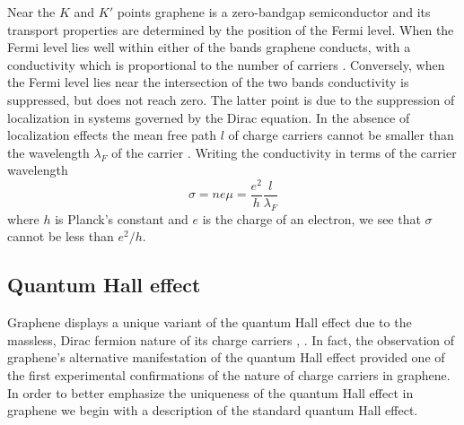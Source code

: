 \documentclass[edeposit,fullpage,draftthesis]{uiucthesis2009}
\begin{document}
        Near the $K$ and $K'$ points graphene is a zero-bandgap semiconductor and its transport properties are
        determined by the position of the Fermi level. When the Fermi level lies well within either of the bands
        graphene conducts, with a conductivity which is proportional to the number of carriers \cite{Hwang2007}.
        Conversely, when the Fermi level lies near the intersection of the two bands conductivity is suppressed,
        but does not reach zero. The latter point is due to the suppression of localization in systems governed
        by the Dirac equation. In the absence of localization effects the mean free path $l$ of charge carriers
        cannot be smaller than the wavelength $\lambda_F$ of the carrier  \cite{novoselov2005two}. Writing
        the conductivity in terms of the carrier wavelength
        \begin{equation}
            \sigma = n e \mu = \frac{e^2}{h} \frac{l}{\lambda_F}
        \end{equation}
        where $h$ is Planck's constant and $e$ is the charge of an electron, we see that $\sigma$ cannot be less
        than $e^2/h$.
        
    \subsection{Quantum Hall effect}
    	
        Graphene displays a unique variant of the quantum Hall effect due to the massless, 
        Dirac fermion nature of its charge carriers \cite{Novoselov2005}, \cite{Zhang2005}. In fact,
        the observation of graphene's alternative manifestation of the quantum Hall effect provided
        one of the first experimental confirmations of the nature of charge carriers in graphene.
        In order to better emphasize the uniqueness of the quantum Hall effect
        in graphene we begin with a description of the standard quantum Hall effect.
        
\end{document}
